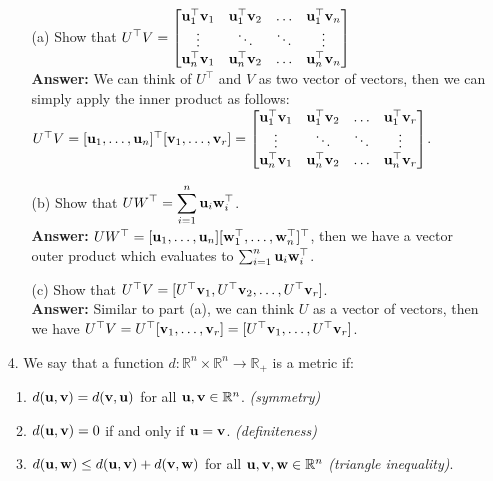 \documentclass{article}
\newcommand{\bu}{{\bf u}}
\newcommand{\bv}{{\bf v}}
\newcommand{\bw}{{\bf w}}
\begin{document}
\begin{itemize}
            \begin{itemize}
                  \item [(a)] Show that $\displaystyle U^{\top}V = \left[\begin{matrix} \bu_{1}^{\top}\bv_1 & \bu_{1}^{\top}\bv_2 & \ldots & \bu_{1}^{\top}\bv_{n} \\ \vdots & \ddots & \ddots & \vdots \\ \bu_{n}^{\top}\bv_{1} & \bu_{n}^{\top}\bv_{2} & \ldots & \bu_{n}^{\top}\bv_{n} \end{matrix}\right]$\\
                        \textbf{Answer: } We can think of $U^{\top}$ and $V$ as two vector of vectors, then we can simply apply the inner product as follows: $U^{\top}V=[\bu_1,\ldots,\bu_n]^{\top}[\bv_1,\ldots,\bv_r]=\left[\begin{matrix} \bu_{1}^{\top}\bv_1 & \bu_{1}^{\top}\bv_2 & \ldots & \bu_{1}^{\top}\bv_{r} \\ \vdots & \ddots & \ddots & \vdots \\ \bu_{n}^{\top}\bv_{1} & \bu_{n}^{\top}\bv_{2} & \ldots & \bu_{n}^{\top}\bv_{r} \end{matrix}\right]$.
                  \item [(b)] Show that $\displaystyle UW^{\top} = \sum_{i=1}^{n}\bu_{i}\bw_{i}^{\top}$.\\
                        \textbf{Answer: } $UW^{\top}=[\bu_1,\ldots,\bu_n][\bw_1^{\top},\ldots,\bw_n^{\top}]^{\top}$, then we have a vector outer product which evaluates to $\sum_{i=1}^{n}\bu_{i}\bw_{i}^{\top}$.
                  \item [(c)] Show that $U^{\top}V = [U^{\top}\bv_1, U^{\top}\bv_2,\ldots, U^{\top}\bv_{r}]$.\\
                        \textbf{Answer: } Similar to part (a), we can think $U$ as a vector of vectors, then we have $U^{\top}V=U^{\top}[\bv_1,\ldots,\bv_r]=[U^{\top}\bv_1,\ldots,U^{\top}\bv_r]$.
            \end{itemize}
      \item [4.] We say that a function $d: \mathbb{R}^{n}\times \mathbb{R}^{n} \to \mathbb{R}_{+}$ is a metric if:
            \begin{enumerate}
                  \item $d(\bu,\bv) = d(\bv,\bu)$ for all $\bu,\bv\in\mathbb{R}^{n}$. {\em (symmetry)}
                  \item $d(\bu,\bv) = 0$ if and only if $\bu = \bv$. {\em (definiteness)}
                  \item $d(\bu,\bw) \leq d(\bu,\bv) + d(\bv,\bw)$ for all $\bu,\bv,\bw\in\mathbb{R}^{n}$ {\em (triangle inequality)}.

\end{enumerate}
\end{itemize}
\end{document}
